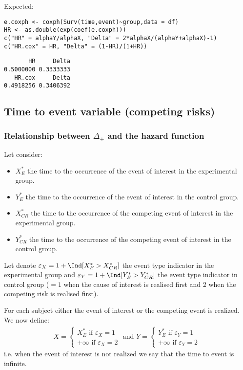 \documentclass[12pt]{article}
\begin{document}
Expected:
\lstset{language=r,label= ,caption= ,captionpos=b,numbers=none}
\begin{lstlisting}
e.coxph <- coxph(Surv(time,event)~group,data = df)
HR <- as.double(exp(coef(e.coxph)))
c("HR" = alphaY/alphaX, "Delta" = 2*alphaX/(alphaY+alphaX)-1)
c("HR.cox" = HR, "Delta" = (1-HR)/(1+HR))
\end{lstlisting}

\begin{verbatim}
       HR     Delta 
0.5000000 0.3333333
   HR.cox     Delta 
0.4918256 0.3406392
\end{verbatim}

\clearpage

\subsection{Time to event variable (competing risks)}
\label{sec:orgb342dc9}
\subsubsection{Relationship between \(\Delta_+\) and the hazard function}
\label{sec:org435e992}
Let consider: 
\begin{itemize}
\item \(X^*_{E}\) the time to the occurrence of the event of interest in the experimental group.
\item \(Y^*_{E}\) the time to the occurrence of the event of interest in the control group.
\item \(X^*_{CR}\) the time to the occurrence of the competing event of interest in the experimental group.
\item \(Y^*_{CR}\) the time to the occurrence of the competing event of interest in the control group.
\end{itemize}
Let denote \(\varepsilon_X = 1 +\Ind[X^*_{E} > X^*_{CR}]\) the event type
indicator in the experimental group and \(\varepsilon_Y = 1 + \Ind[Y^*_{E} >
Y^*_{CR}]\) the event type indicator in control group (\(=1\) when the
cause of interest is realised first and 2 when the competing risk is
realised first).

\bigskip

For each subject either the event of interest or the competing event
is realized. We now define:
\begin{align*}
X = \left\{
              \begin{array}{ll}
                 X^*_{E} \text{ if }\varepsilon_X = 1  \\
                 +\infty \text{ if }\varepsilon_X = 2 
                \end{array}
              \right.
\text{ and }
Y = \left\{
              \begin{array}{ll}
                 Y^*_{E} \text{ if }\varepsilon_Y = 1  \\
                 +\infty \text{ if }\varepsilon_Y = 2 
                \end{array}
              \right.
\end{align*}
i.e. when the event of interest is not realized we say that the time to event is infinite.
\end{document}
